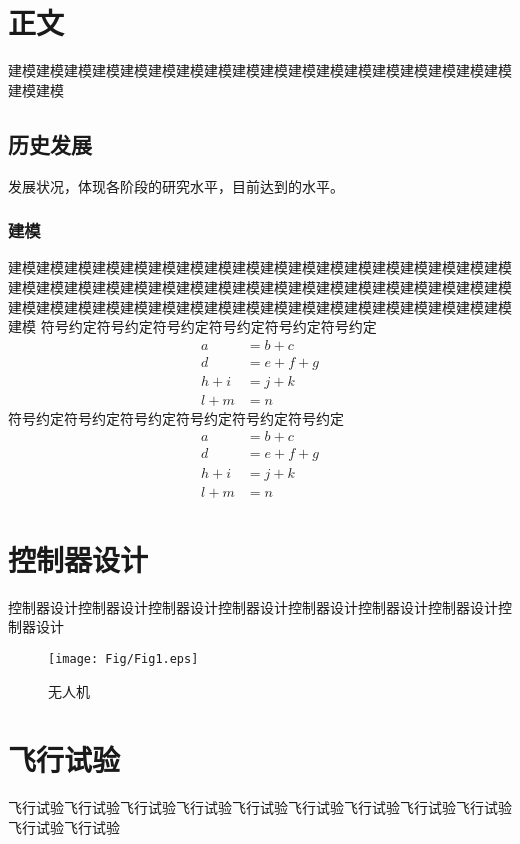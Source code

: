 \section{正文}
\label{sec:1}
建模建模建模建模建模建模建模建模建模建模建模建模建模建模建模建模建模建模建模建模

\subsection{历史发展}
发展状况，体现各阶段的研究水平，目前达到的水平。
\subsubsection{建模}
建模建模建模建模建模建模建模建模建模建模建模建模建模建模建模建模建模建模建模建模建模建模建模建模建模建模建模建模建模建模建模建模建模建模建模建模建模建模建模建模建模建模建模建模建模建模建模建模建模建模建模建模建模建模建模
符号约定符号约定符号约定符号约定符号约定符号约定
\begin{equation}
	\begin{aligned}
		a &= b + c \\
		d &= e + f + g \\
		h + i &= j + k \\
		l + m &= n
	\end{aligned}
\end{equation}
符号约定符号约定符号约定符号约定符号约定符号约定
\begin{equation}
	\begin{aligned}
		a &= b + c \\
		d &= e + f + g \\
		h + i &= j + k \\
		l + m &= n
	\end{aligned}
\end{equation}
\section{控制器设计}
控制器设计控制器设计控制器设计控制器设计控制器设计控制器设计控制器设计控制器设计
\begin{figure}[!h]
	\centering
	\texttt{[image: Fig/Fig1.eps]}
	\caption{无人机}
	\label{fig:1}     
\end{figure}
\section{飞行试验}
飞行试验飞行试验飞行试验飞行试验飞行试验飞行试验飞行试验飞行试验飞行试验飞行试验飞行试验
\begin{table}[H]
	\centering
	\small
	\caption{数值}
\end{table}
